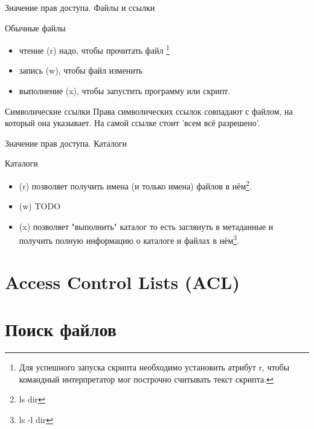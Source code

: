 \begin{frame}{Значение прав доступа. Файлы и ссылки}

  \begin{block}{Обычные файлы}
    \begin{itemize}
      \item чтение \alert{(r)} надо, чтобы прочитать файл
	\footnote{Для успешного запуска скрипта необходимо установить атрибут \alert{r}, чтобы командный интерпретатор мог построчно считывать текст скрипта.}
      \item запись \alert{(w)}, чтобы файл изменить
      \item выполнение \alert{(x)}, чтобы запустить программу или скрипт.
    \end{itemize}
  \end{block} \pause

  \begin{block}{Символические ссылки}
    \small{Права символических ссылок совпадают с файлом, на который она указывает. На самой ссылке стоит 'всем всё разрешено'.}
  \end{block}

\end{frame}

\begin{frame}{Значение прав доступа. Каталоги}
  \begin{block}{Каталоги}
    \begin{itemize}
      \item \alert{(r)} позволяет получить имена (и только имена) файлов в нём\footnote{ls dir}. 
      \item \alert{(w)} TODO 
      \item \alert{(x)} позволяет "выполнить" каталог\newline
	то есть заглянуть в метаданные  и получить полную информацию о каталоге и файлах в нём\footnote{ls -l dir}.
    \end{itemize}
  \end{block}
\end{frame}

\section{Access Control Lists (ACL)}

\section{Поиск файлов}


